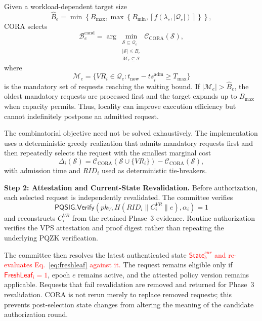 \documentclass[lettersize,journal]{IEEEtran}
\begin{document}
Given a workload-dependent target size
\begin{equation}
\widehat{B}_e
=
\min\!\left\{
B_{\max},
\max\!\left\{
B_{\min},
\left\lceil
f(\lambda_e,|\mathcal{Q}_e|)
\right\rceil
\right\}
\right\},
\end{equation}
CORA selects
\begin{equation}
\mathcal{B}_e^{\mathrm{cand}}
=
\arg\min_{\substack{
\mathcal{S}\subseteq\mathcal{Q}_e\\
|\mathcal{S}|\leq\widehat{B}_e\\
\mathcal{M}_e\subseteq\mathcal{S}
}}
\mathcal{C}_{\mathrm{CORA}}(\mathcal{S}),
\end{equation}
where
\begin{equation}
\mathcal{M}_e=
\{VR_i\in\mathcal{Q}_e:
t_{\mathrm{now}}-ts_i^{\mathrm{adm}}\geq T_{\max}\}
\end{equation}
is the mandatory set of requests reaching the waiting bound. If
$|\mathcal{M}_e|>\widehat{B}_e$, the oldest mandatory requests are
processed first and the target expands up to $B_{\max}$ when capacity
permits. Thus, locality can improve execution efficiency but cannot
indefinitely postpone an admitted request.

The combinatorial objective need not be solved exhaustively. The
implementation uses a deterministic greedy realization that admits
mandatory requests first and then repeatedly selects the request with
the smallest marginal cost
\begin{equation}
\Delta_i(\mathcal{S})
=
\mathcal{C}_{\mathrm{CORA}}
(\mathcal{S}\cup\{VR_i\})
-
\mathcal{C}_{\mathrm{CORA}}(\mathcal{S}),
\end{equation}
with admission time and $RID_i$ used as deterministic tie-breakers.

\medskip
\noindent\textbf{Step 2: Attestation and Current-State Revalidation.}
Before authorization, each selected request is independently
revalidated. The committee verifies
\begin{equation}
\mathsf{PQSIG.Verify}
\left(
pk_V,
H(RID_i\parallel C_i^{VR}\parallel e),
\alpha_i
\right)=1
\end{equation}
and reconstructs $C_i^{VR}$ from the retained Phase~3 evidence.
Routine authorization verifies the VPS attestation and proof digest
rather than repeating the underlying PQZK verification.

The committee then resolves the latest authenticated state
\textcolor{red}{$\mathsf{State}_b^{cur}$ and re-evaluates
Eq.~\eqref{eq:freshleaf} against it.}
The request remains eligible only if
\textcolor{red}{$\mathsf{FreshLeaf}_i=1$},
epoch $e$ remains active, and the attested policy version remains
applicable. Requests that fail revalidation are removed and returned
for Phase~3 revalidation. CORA is not rerun merely to replace removed
requests; this prevents post-selection state changes from altering the
meaning of the candidate authorization round.
\end{document}

